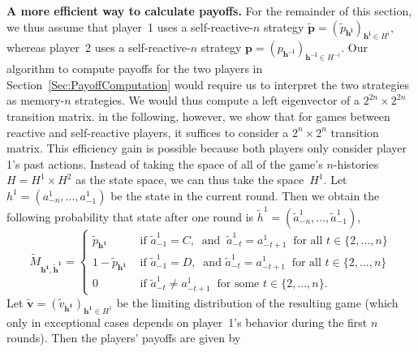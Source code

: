 \documentclass[11pt]{article}
\theoremstyle{plainCl1}
\theoremstyle{plainCl2}
\begin{document}
\noindent
{\bf A more efficient way to calculate payoffs.}
For the remainder of this section, we thus assume that player~1 uses a self-reactive-$n$ strategy $\mathbf{\tilde p}\!=\!(\tilde p_\mathbf{h^i})_{\mathbf{h^i}\in H^i}$, whereas player~2 uses a self-reactive-$n$ strategy $\mathbf{p}\!=\!(p_\mathbf{h^{-i}})_{\mathbf{h^{-i}}\in H^{-i}}$. 
Our algorithm to compute payoffs for the two players in Section~\ref{Sec:PayoffComputation} would require us to interpret the two strategies as memory-$n$ strategies. 
We would thus compute a left eigenvector of a $2^{2n}\!\times\!2^{2n}$ transition matrix. 
in the following, however, we show that for games between reactive and self-reactive players, it suffices to consider a $2^n\!\times\!2^n$ transition matrix.
This efficiency gain is possible because both players only consider player 1's past actions.  
Instead of taking the space of all of the game's $n$-histories $H\!=\!H^1\!\times\! H^2$  as the state space, we can thus take the space~$H^1$. 
Let \(h^1=(a^1_{-n},\ldots,a^1_{-1})\) be the state in the current round. 
Then we obtain the following probability that state after one round is  \(\tilde{h}^1=(\tilde{a}^1_{-n},\ldots,\tilde{a}^1_{-1})\),\begin{equation}\label{Eq:TransitionMatrixSelfReactive}
\tilde{M}_{\mathbf{h^1},\mathbf{ \tilde{h}^1}} = 
\begin{cases}
  \tilde{p}_\mathbf{h^1} & \text{ if } \tilde{a}^1_{-1}\! =\! C,~\text{ and }~\tilde{a}^1_{-t} \!=\! a^1_{-t + 1}~\text{ for all } t\!\in\!\{2,\ldots,n\}\\
  1 - \tilde{p}_\mathbf{h^1} & \text{ if } \tilde{a}^1_{-1}\!=\! D,~\text{ and } \tilde{a}^1_{-t} \!=\! a^1_{-t + 1}~\text{ for all } t\!\in\!\{2,\ldots,n\}\\
  0 & \text{ if } \tilde{a}^1_{-t} \!\neq\!  a^1_{-t + 1}~ \text{ for some } t\!\in\!\{2,\ldots,n\}.
\end{cases}
\end{equation}
Let $\mathbf{\tilde{v}}\!=\!(\tilde{v}_\mathbf{h^1})_{\mathbf{h^1}\in H^1}$ be the limiting distribution of the resulting game (which only in exceptional cases depends on player~1's behavior during the first $n$ rounds). Then the players' payoffs are given by
\end{document}

